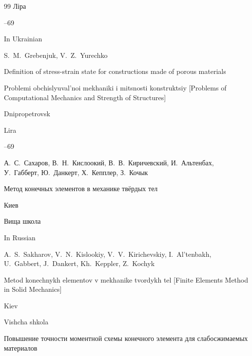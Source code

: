 \begin{thebibliography}{99}
\publ Ліра



--69

\misctransl

\lang In Ukrainian

\by S.~M.~Grebenjuk, V.~Z.~Yurechko

\paper Definition of stress-strain state for constructions made of porous materials

\inbook Problemi obchislyuval'noi mekhaniki i mitsnosti konstruktsiy \rm [Problems of Computational Mechanics and Strength of Structures]

\publaddr Dnipropetrovsk

\publ Lira



--69






\by А.~С.~Сахаров, В.~Н.~Кислоокий, В.~В.~Киричевский, И.~Альтенбах, У.~Габберт, Ю.~Данкерт, Х.~Кепплер, З.~Кочык

\book Метод конечных элементов в механике твёрдых тел

\publaddr Киев

\publ Вища школа



\misctransl

\lang In Russian

\by A.~S.~Sakharov, V.~N.~Kislookiy, V.~V.~Kirichevskiy, I.~Al'tenbakh, U.~Gabbert, J.~Dankert, Kh.~Keppler, Z.~Kochyk

\book Metod konechnykh elementov v mekhanike tvordykh tel \rm [Finite Elements Method in Solid Mechanics]

\publaddr Kiev

\publ Vishcha shkola



 






\paper Повышение точности моментной схемы конечного элемента для слабосжимаемых материалов


\end{thebibliography}
